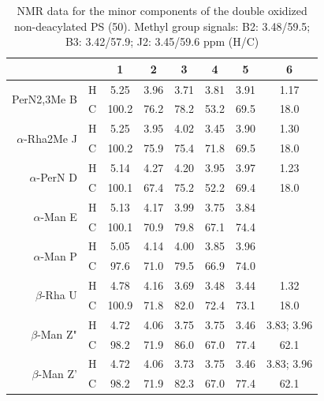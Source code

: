 		 \begin{table}[htb]
			 \centering
			 \caption[\Ac{NMR} data for the minor components of the double oxidized non-deacylated \ac{PS}]{\ac{NMR} data for the minor components of the double oxidized non-deacylated \ac{PS} (50\cel). Methyl group signals: B2: 3.48/59.5; B3: 3.42/57.9; J2: 3.45/59.6 ppm (H/C)}
			 \label{tbl:lpsends}
			 \begin{tabular}{@{}rccccccc@{}}
				 \toprule
         &   & 1     & 2    & 3    & 4    & 5    & 6 \\ \midrule
				 \multirow{2}{*}{PerN2,3Me B}       & H & 5.25  & 3.96 & 3.71 & 3.81 & 3.91 & 1.17 \\
         & C & 100.2 & 76.2 & 78.2 & 53.2 & 69.5 & 18.0 \\
				 \multirow{2}{*}{$\alpha$-Rha2Me J} & H & 5.25  & 3.95 & 4.02 & 3.45 & 3.90 & 1.30 \\
         & C & 100.2 & 75.9 & 75.4 & 71.8 & 69.5 & 18.0 \\
				 \multirow{2}{*}{$\alpha$-PerN D}   & H & 5.14  & 4.27 & 4.20 & 3.95 & 3.97 & 1.23 \\
         & C & 100.1 & 67.4 & 75.2 & 52.2 & 69.4 & 18.0 \\
				 \multirow{2}{*}{$\alpha$-Man E}    & H & 5.13  & 4.17 & 3.99 & 3.75 & 3.84 & \\
         & C & 100.1 & 70.9 & 79.8 & 67.1 & 74.4 & \\
				 \multirow{2}{*}{$\alpha$-Man P}    & H & 5.05  & 4.14 & 4.00 & 3.85 & 3.96 & \\
         & C & 97.6  & 71.0 & 79.5 & 66.9 & 74.0 & \\
				 \multirow{2}{*}{$\beta$-Rha U}     & H & 4.78  & 4.16 & 3.69 & 3.48 & 3.44 & 1.32 \\
         & C & 100.9 & 71.8 & 82.0 & 72.4 & 73.1 & 18.0 \\
				 \multirow{2}{*}{$\beta$-Man Z"}    & H & 4.72  & 4.06 & 3.75 & 3.75 & 3.46 & 3.83; 3.96 \\
         & C & 98.2  & 71.9 & 86.0 & 67.0 & 77.4 & 62.1 \\
				 \multirow{2}{*}{$\beta$-Man Z'}    & H & 4.72  & 4.06 & 3.73 & 3.75 & 3.46 & 3.83; 3.96 \\
         & C & 98.2  & 71.9 & 82.3 & 67.0 & 77.4 & 62.1 \\ \bottomrule
			 \end{tabular}
		 \end{table} %

